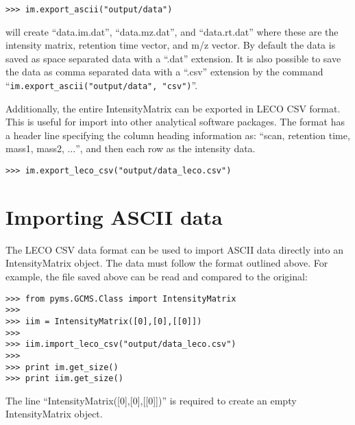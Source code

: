 \begin{verbatim}
>>> im.export_ascii("output/data")
\end{verbatim}

\noindent
will create ``data.im.dat'', ``data.mz.dat'', and ``data.rt.dat'' where these
are the intensity matrix, retention time vector, and m/z vector. By default
the data is saved as space separated data with a ``.dat'' extension. It is
also possible to save the data as comma separated data with a ``.csv''
extension by the command ``{\tt im.export\_ascii("output/data", "csv")}''.

Additionally, the entire IntensityMatrix can be exported in LECO CSV format.
This is useful for import into other analytical software packages. The format
has a header line specifying the column heading information as: ``scan,
retention time, mass1, mass2, $\dots$'', and then each row as the intensity
data.

\begin{verbatim}
>>> im.export_leco_csv("output/data_leco.csv")
\end{verbatim}

\section{Importing ASCII data}


The LECO CSV data format can be used to import ASCII data directly into an
IntensityMatrix object.  The data must follow the format outlined above.
For example, the file saved above can be read and compared to the original:

\begin{verbatim}
>>> from pyms.GCMS.Class import IntensityMatrix
>>>
>>> iim = IntensityMatrix([0],[0],[[0]])
>>>
>>> iim.import_leco_csv("output/data_leco.csv")
>>>
>>> print im.get_size()
>>> print iim.get_size()
\end{verbatim}

The line ``IntensityMatrix([0],[0],[[0]])'' is required to create an empty
IntensityMatrix object.

